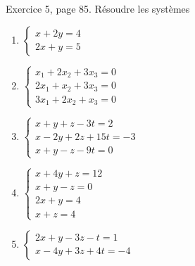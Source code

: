 \begin{exercice}\label{exoLineraire0001}

Exercice 5, page 85. Résoudre les systèmes
\begin{multicols}{2}
\begin{enumerate}
\item

$
\left\{
\begin{array}{ll}
x+2y=4\\
2x+y=5
\end{array}
\right.
$
\item
$
\left\{
\begin{array}{ll}
x_1+2x_2+3x_3=0\\
2x_1+x_2+3x_3=0\\
3x_1+2x_2+x_3=0
\end{array}
\right.
$
\item
$
\left\{
\begin{array}{ll}
x+y+z-3t=2\\
x-2y+2z+15t=-3\\
x+y-z-9t=0
\end{array}
\right.
$

\item
$
\left\{
\begin{array}{ll}
x+4y+z=12\\
x+y-z=0\\
2x+y=4\\
x+z=4
\end{array}
\right.
$
\item
$\left\{
\begin{array}{ll}
2x+y-3z-t=1\\
x-4y+3z+4t=-4
\end{array}
\right.$
\end{enumerate}	
\end{multicols}

\end{exercice}
